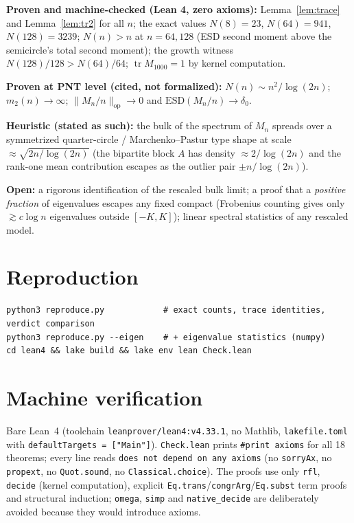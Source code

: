 \documentclass[11pt]{article}
\begin{document}
\textbf{Proven and machine-checked (Lean 4, zero axioms):} Lemma~\ref{lem:trace} and
Lemma~\ref{lem:tr2} for all $n$; the exact values $N(8)=23$, $N(64)=941$,
$N(128)=3239$; $N(n)>n$ at $n=64,128$ (ESD second moment above the semicircle's total
second moment); the growth witness $N(128)/128>N(64)/64$; $\operatorname{tr}M_{1000}=1$
by kernel computation.

\textbf{Proven at PNT level (cited, not formalized):} $N(n)\sim n^2/\log(2n)$;
$m_2(n)\to\infty$; $\|M_n/n\|_{\mathrm{op}}\to0$ and $\mathrm{ESD}(M_n/n)\to\delta_0$.

\textbf{Heuristic (stated as such):} the bulk of the spectrum of $M_n$ spreads over a
symmetrized quarter-circle / Marchenko--Pastur type shape at scale
$\approx\sqrt{2n/\log(2n)}$ (the bipartite block $A$ has density $\approx2/\log(2n)$ and
the rank-one mean contribution escapes as the outlier pair $\pm n/\log(2n)$).

\textbf{Open:} a rigorous identification of the rescaled bulk limit; a proof that a
\emph{positive fraction} of eigenvalues escapes any fixed compact (Frobenius counting
gives only $\gtrsim c\log n$ eigenvalues outside $[-K,K]$); linear spectral statistics
of any rescaled model.

\section{Reproduction}

\begin{verbatim}
python3 reproduce.py            # exact counts, trace identities, verdict comparison
python3 reproduce.py --eigen    # + eigenvalue statistics (numpy)
cd lean4 && lake build && lake env lean Check.lean
\end{verbatim}

\section{Machine verification}

Bare Lean~4 (toolchain \texttt{leanprover/lean4:v4.33.1}, no Mathlib,
\texttt{lakefile.toml} with \texttt{defaultTargets = ["Main"]}). \texttt{Check.lean}
prints \texttt{\#print axioms} for all 18 theorems; every line reads
\texttt{does not depend on any axioms} (no \texttt{sorryAx}, no \texttt{propext}, no
\texttt{Quot.sound}, no \texttt{Classical.choice}). The proofs use only
\texttt{rfl}, \texttt{decide} (kernel computation), explicit
\texttt{Eq.trans}/\texttt{congrArg}/\texttt{Eq.subst} term proofs and structural
induction; \texttt{omega}, \texttt{simp} and \texttt{native\_decide} are deliberately
avoided because they would introduce axioms.
\end{document}
